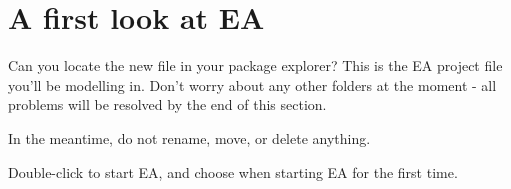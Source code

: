 \clearpage
\genHeader

\section{A first look at EA}

\begin{stepbystep}
\FloatBarrier
\hypertarget{simpleDemo vis}{}
\item Can you locate the new  file in your package explorer? This is the EA project file you'll be
modelling in. Don't worry about any other folders at the moment - all problems will be resolved by the end of this section.

In the meantime, do not rename, move, or delete anything.

\item Double-click  to start EA, and choose  when starting EA for the first time.


\end{stepbystep}
